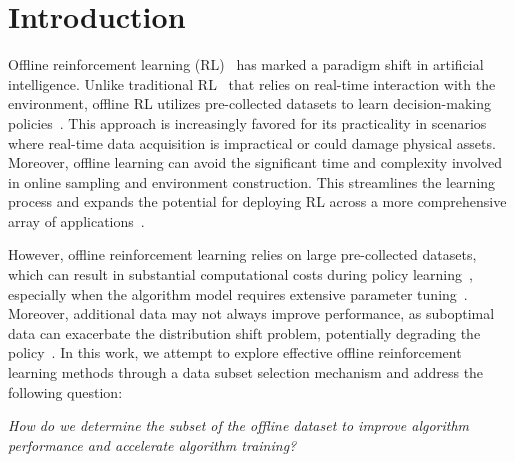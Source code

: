\section{Introduction}

Offline reinforcement learning (RL)~\citep{levine2020offline} has marked a paradigm shift in artificial intelligence. Unlike traditional RL~\citep{sutton2018reinforcement} that relies on real-time interaction with the environment, offline RL utilizes pre-collected datasets to learn decision-making policies~\citep{yang2021believe,janner2021offline}. This approach is increasingly favored for its practicality in scenarios where real-time data acquisition is impractical or could damage physical assets. Moreover, offline learning can avoid the significant time and complexity involved in online sampling and environment construction. This streamlines the learning process and expands the potential for deploying RL across a more comprehensive array of applications~\citep{yuan2022offline, zhou2023real, nambiar2023deep}.


However, offline reinforcement learning relies on large pre-collected datasets, which can result in substantial computational costs during policy learning~\citep{lu2022challenges}, especially when the algorithm model requires extensive parameter tuning~\citep{sharir2020cost}.
Moreover, additional data may not always improve performance, as suboptimal data can exacerbate the distribution shift problem, potentially degrading the policy~\citep{hu2022role}.
In this work, we attempt to explore effective offline reinforcement learning methods through a data subset selection mechanism and address the following question:

\begin{center}
    \it{How do we determine the subset of the offline dataset to improve algorithm performance and accelerate algorithm training?}
\end{center}

